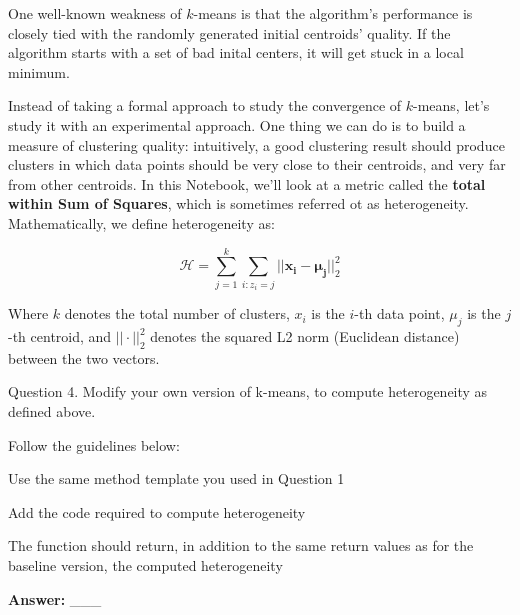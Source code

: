 \documentclass[11pt]{article}
\begin{document}
One well-known weakness of \(k\)-means is that the algorithm's
performance is closely tied with the randomly generated initial
centroids' quality. If the algorithm starts with a set of bad inital
centers, it will get stuck in a local minimum.

Instead of taking a formal approach to study the convergence of
\(k\)-means, let's study it with an experimental approach. One thing we
can do is to build a measure of clustering quality: intuitively, a good
clustering result should produce clusters in which data points should be
very close to their centroids, and very far from other centroids. In
this Notebook, we'll look at a metric called the \textbf{total within
Sum of Squares}, which is sometimes referred ot as heterogeneity.
Mathematically, we define heterogeneity as:

\[
\mathcal{H} = \sum_{j=1}^{k} \sum_{i: z_i=j} || \boldsymbol{x_i} - \boldsymbol{\mu_j}||_{2}^{2}
\]

Where \(k\) denotes the total number of clusters, \(x_i\) is the
\(i\)-th data point, \(\mu_j\) is the \(j\)-th centroid, and
\(|| \cdot ||_{2}^{2}\) denotes the squared L2 norm (Euclidean distance)
between the two vectors.

    Question 4. Modify your own version of k-means, to compute heterogeneity
as defined above.

Follow the guidelines below:

Use the same method template you used in Question 1

Add the code required to compute heterogeneity

The function should return, in addition to the same return values as for
the baseline version, the computed heterogeneity

    \textbf{Answer:} \_\_\_
\end{document}
